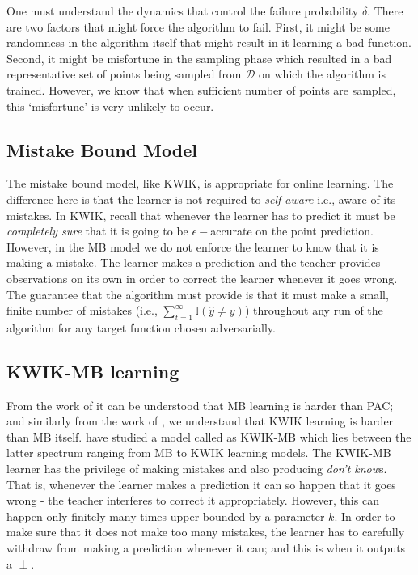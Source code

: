 One must understand the dynamics that control the failure probability $\delta$. There are two factors that might force the algorithm to fail. First, it might be some randomness in the algorithm itself that might result in it learning a bad function. Second, it might be misfortune in the sampling phase which resulted in a bad representative set of points being sampled from $\mathcal{D}$ on which the algorithm is trained. However, we know that when sufficient number of points are sampled, this `misfortune' is very unlikely to occur. \\

\subsection{Mistake Bound Model}
The mistake bound model, like KWIK, is appropriate for online learning. The difference here is that the learner is not required to \textit{self-aware} i.e., aware of its mistakes. In KWIK, recall that whenever the learner has to predict it must be \textit{completely sure} that it is going to be $\epsilon-$accurate on the point prediction. However, in the MB model we do not enforce the learner to know that it is making a mistake. The learner makes a prediction and the teacher provides observations on its own in order to correct the learner whenever it goes wrong. The guarantee that the algorithm must provide is that it must make a small, finite number of mistakes (i.e., $\sum_{t=1}^{\infty} \mathbb{I}(\hat{y} \neq y)$) throughout any run of the algorithm for any target function chosen adversarially. \\




\subsection{KWIK-MB learning}
From the work of \citet{Littlestone:1989:OBL:93335.93365}  it can be understood that MB learning is harder than PAC; and similarly from the work of \citet{Blum:1994:SDM:196751.196815}, we understand that KWIK learning is harder than MB itself. \citet{DBLP:conf/nips/SayediZB10} have studied a model called as KWIK-MB which lies between the latter spectrum ranging from MB to KWIK learning models. The KWIK-MB learner has the privilege of making mistakes and also producing \textit{don't know}s. That is, whenever the learner makes a prediction it can so happen that it goes wrong - the teacher interferes to correct it appropriately. However, this can happen only finitely many times upper-bounded by a parameter $k$. In order to make sure that it does not make too many mistakes, the learner has to carefully withdraw from making a prediction whenever it can; and this is when it outputs a $\perp$.

